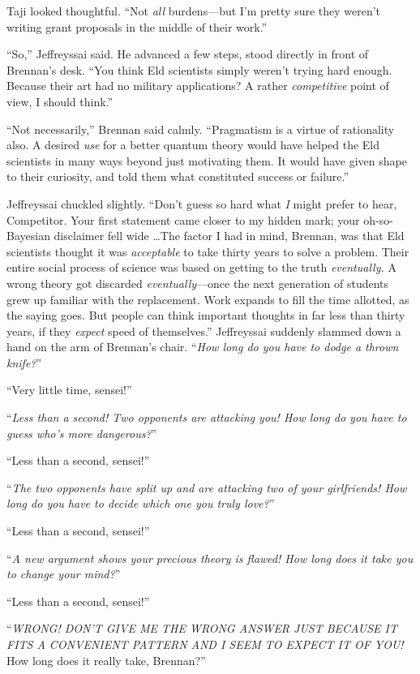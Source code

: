{
 Taji looked thoughtful. ``Not \textit{all}
burdens---but I'm pretty sure they
weren't writing grant proposals in the middle of their
work.''}

{
 ``So,'' Jeffreyssai said. He
advanced a few steps, stood directly in front of
Brennan's desk. ``You think Eld
scientists simply weren't trying hard enough. Because
their art had no military applications? A rather \textit{competitive}
point of view, I should think.''}

{
 ``Not necessarily,'' Brennan
said calmly. ``Pragmatism is a virtue of rationality
also. A desired \textit{use} for a better quantum theory would have
helped the Eld scientists in many ways beyond just motivating them. It
would have given shape to their curiosity, and told them what
constituted success or failure.''}

{
 Jeffreyssai chuckled slightly.
``Don't guess so hard what \textit{I}
might prefer to hear, Competitor. Your first statement came closer to
my hidden mark; your oh-so-Bayesian disclaimer fell wide \ldots The
factor I had in mind, Brennan, was that Eld scientists thought it was
\textit{acceptable} to take thirty years to solve a problem. Their
entire social process of science was based on getting to the truth
\textit{eventually.} A wrong theory got discarded
\textit{eventually}{}---once the next generation of students grew up
familiar with the replacement. Work expands to fill the time allotted,
as the saying goes. But people can think important thoughts in far less
than thirty years, if they \textit{expect} speed of
themselves.'' Jeffreyssai suddenly slammed down a
hand on the arm of Brennan's chair.
``\textit{How long do you have to dodge a thrown
knife?}''}

{
 ``Very little time, sensei!''}

{
 ``\textit{Less than a second! Two opponents are
attacking you! How long do you have to guess who's more
dangerous?}''}

{
 ``Less than a second,
sensei!''}

{
 ``\textit{The two opponents have split up and are
attacking two of your girlfriends! How long do you have to decide which
one you truly love?}''}

{
 ``Less than a second,
sensei!''}

{
 ``\textit{A new argument shows your precious
theory is flawed! How long does it take you to change your
mind?}''}

{
 ``Less than a second,
sensei!''}

{
 ``\textit{WRONG! DON'T GIVE ME
THE WRONG ANSWER JUST BECAUSE IT FITS A CONVENIENT PATTERN AND I SEEM
TO EXPECT IT OF YOU!} How long does it really take,
Brennan?''}

